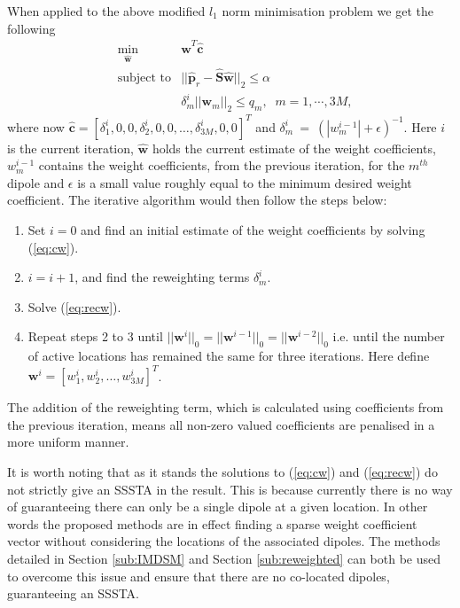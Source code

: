 \documentclass[10pt,final]{IEEEtran}
\begin{document}
When applied to the above modified $l_{1}$ norm minimisation problem we get the following
\begin{eqnarray}\label{eq:recw}\nonumber
&\min\limits_{\hat{\textbf{w}}}& \hat{\textbf{w}}^{T}\hat{\textbf{c}}\\
\nonumber &\text{subject to}&
    ||\hat{\textbf{p}}_{r}-\hat{\textbf{S}}\hat{\textbf{w}}||_{2}\leq\alpha\\&&
    \delta_{m}^{i}||\textbf{w}_{m}||_{2}\leq q_{m},\; \;m=1, \cdots, 3M,
\end{eqnarray}
where now $\hat{\textbf{c}} = [\delta^{i}_{1}, 0, 0, \delta^{i}_{2}, 0, 0, \ldots, \delta^{i}_{3M},0, 0]^{T}$ and $\delta^{i}_{m}~=~(|w_{m}^{i-1}|+\epsilon)^{-1}.$  Here $i$ is the current iteration, $\hat{\textbf{w}}$ holds the current estimate of the
weight coefficients, $w_{m}^{i-1}$ contains the weight coefficients, from the previous iteration, for the $m^{th}$ dipole
and $\epsilon$ is a small value roughly equal to the minimum desired
weight coefficient. The iterative algorithm would then follow the
steps below:
\begin{enumerate}
  \item Set $i = 0$ and find an initial estimate of the weight coefficients
  by solving (\ref{eq:cw}).
  \item $i = i + 1$, and find the reweighting terms $\delta_{m}^{i}$.
  \item Solve (\ref{eq:recw}).
  \item Repeat steps 2 to 3 until
  $||\textbf{w}^{i}||_{0}=||\textbf{w}^{i-1}||_{0}=||\textbf{w}^{i-2}||_{0}$ i.e. until the
  number of active locations has remained the same for three
  iterations.  Here define $\textbf{w}^{i}=[w_{1}^{i}, w_{2}^{i}, \ldots, w_{3M}^{i}]^{T}$.
\end{enumerate}
The addition of the reweighting term, which is calculated using
coefficients from the previous iteration, means all non-zero valued
coefficients are penalised in a more uniform manner.

It is worth noting that as it stands the solutions to (\ref{eq:cw}) and (\ref{eq:recw}) do not strictly give an SSSTA in the result.  This is because currently there is no way of guaranteeing there can only be a single dipole at a given location.  In other words the proposed methods are in effect finding a sparse weight coefficient vector without considering the locations of the associated dipoles.  The methods detailed in Section \ref{sub:IMDSM} and Section \ref{sub:reweighted} can both be used to overcome this issue and ensure that there are no co-located dipoles, guaranteeing an SSSTA.
\end{document}
